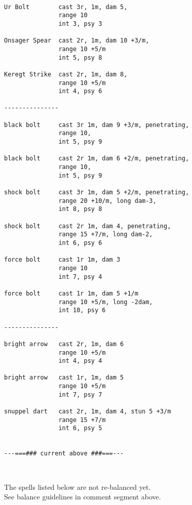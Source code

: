 \

\small \begin{verbatim}
Ur Bolt        cast 3r, 1m, dam 5,
               range 10
               int 3, psy 3

Onsager Spear  cast 2r, 1m, dam 10 +3/m,
               range 10 +5/m
               int 5, psy 8

Keregt Strike  cast 2r, 1m, dam 8,
               range 10 +5/m
               int 4, psy 6

---------------

black bolt     cast 3r 1m, dam 9 +3/m, penetrating,
               range 10, 
               int 5, psy 9

black bolt     cast 2r 1m, dam 6 +2/m, penetrating,
               range 10,
               int 5, psy 9

shock bolt     cast 3r 1m, dam 5 +2/m, penetrating,
               range 20 +10/m, long dam-3,
               int 8, psy 8

shock bolt     cast 2r 1m, dam 4, penetrating,
               range 15 +7/m, long dam-2,
               int 6, psy 6

force bolt     cast 1r 1m, dam 3
               range 10
               int 7, psy 4

force bolt     cast 1r 1m, dam 5 +1/m
               range 10 +5/m, long -2dam,
               int 10, psy 6

---------------

bright arrow   cast 2r, 1m, dam 6
               range 10 +5/m
               int 4, psy 4

bright arrow   cast 1r, 1m, dam 5
               range 10 +5/m
               int 7, psy 7

snuppel dart   cast 2r, 1m, dam 4, stun 5 +3/m
               range 15 +7/m
               int 6, psy 5


---===### current above ###===---
\end{verbatim} \normalsize

\

\noindent 
The spells listed below are not re-balanced yet.\\
See balance guidelines in comment segment above.

\

